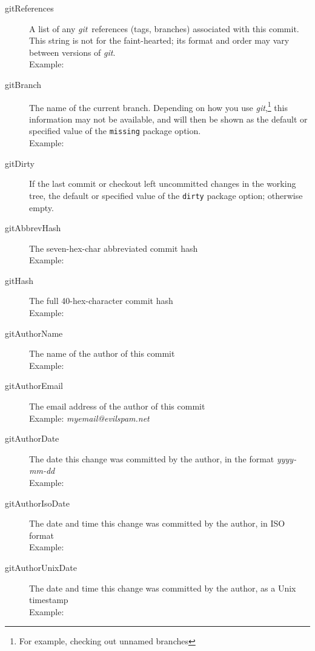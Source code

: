 \documentclass[draft,a4paper,12pt,twoside,openany]{memoir}
\makeatletter
\newcommand{\sfit}[1]{\textit{#1}}
\newcommand{\git}{\sfit{git}}
\newcommand*{\emailat}{@}
\makeatother
\begin{document}
\begin{description}

\item[gitReferences]
    A list of any \git\ references (tags, branches) associated
    with this commit.
    This string is not for the faint-hearted;
    its format and order may vary between versions of \git.\\
    Example:\\\textit{\small\gitReferences}

\item[gitBranch]
    The name of the current branch.
    Depending on how you use \git,\footnote{For example, checking out unnamed branches}
    this information may not be available,
    and will then be shown as the default or specified value of
    the \texttt{missing} package option.\\
    Example: \textit{\gitBranch}

\item[gitDirty]
    If the last commit or checkout left uncommitted changes in the working tree,
    the default or specified value of the \texttt{dirty} package option; 
    otherwise empty.

\item[gitAbbrevHash]
    The seven-hex-char abbreviated commit hash\\
    Example: \textit{\gitAbbrevHash}

\item[gitHash]
    The full 40-hex-character commit hash\\
    Example: \textit{\gitHash}

\item[gitAuthorName]
    The name of the author of this commit\\
    Example: \textit{\gitAuthorName}

\item[gitAuthorEmail]
    The email address of the author of this commit\\
    Example: \textit{myemail\emailat evilspam.net}

\item[gitAuthorDate]
    The date this change was committed by the author,
    in the format \textit{yyyy-mm-dd}\\
    Example: \textit{\gitAuthorDate}

\item[gitAuthorIsoDate]
    The date and time this change was committed by the author,
    in ISO format\\
    Example: \textit{\gitAuthorIsoDate}
\clearpage
\item[gitAuthorUnixDate]
    The date and time this change was committed by the author,
    as a Unix timestamp\\
    Example: \textit{\gitAuthorUnixDate}


\end{description}
\end{document}
